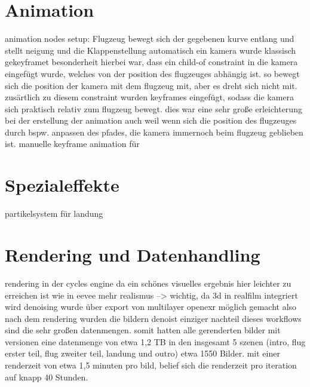 \section{Animation}

animation nodes setup: Flugzeug bewegt sich der gegebenen kurve entlang und stellt neigung und die Klappenstellung automatisch ein
kamera wurde klassisch gekeyframet
besonderheit hierbei war, dass ein child-of constraint in die kamera eingefügt wurde, welches von der position des flugzeuges abhängig ist.
so bewegt sich die position der kamera mit dem flugzeug mit, aber es dreht sich nicht mit. zusärtlich zu diesem constraint wurden keyframes eingefügt, sodass die kamera sich praktisch relativ zum flugzeug bewegt.
dies war eine sehr große erleichterung bei der erstellung der animation
auch weil wenn sich die position des flugzeuges durch bspw. anpassen des pfades, die kamera immernoch beim flugzeug geblieben ist.
manuelle keyframe animation für 

\section{Spezialeffekte}

partikelsystem für landung

\section{Rendering und Datenhandling}

rendering in der cycles engine
da ein schönes visuelles ergebnis hier leichter zu erreichen ist wie in eevee
mehr realismus --> wichtig, da 3d in realfilm integriert wird
denoising wurde über export von multilayer openexr möglich gemacht
also nach dem rendering wurden die bildern denoist
einziger nachteil dieses workflows sind die sehr großen datenmengen. somit hatten alle gerenderten bilder mit versionen eine datenmenge von etwa 1,2 TB
in den insgesamt 5 szenen (intro, flug erster teil, flug zweiter teil, landung und outro) etwa 1550 Bilder.
mit einer renderzeit von etwa 1,5 minuten pro bild, belief sich die renderzeit pro iteration auf knapp 40 Stunden.

